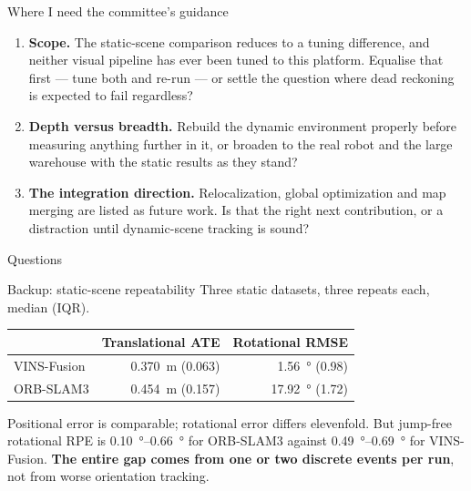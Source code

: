 \documentclass[aspectratio=169,11pt]{beamer}
\begin{document}
\begin{frame}{Where I need the committee's guidance}
  \begin{enumerate}
    \item \textbf{Scope.} The static-scene comparison reduces to a tuning
      difference, and neither visual pipeline has ever been tuned to this
      platform. Equalise that first --- tune both and re-run --- or settle the
      question where dead reckoning is expected to fail regardless?

      \vspace{0.6em}
    \item \textbf{Depth versus breadth.} Rebuild the dynamic environment
      properly before measuring anything further in it, or broaden to the real
      robot and the large warehouse with the static results as they stand?

      \vspace{0.6em}
    \item \textbf{The integration direction.} Relocalization, global
      optimization and map merging are listed as future work. Is that the right
      next contribution, or a distraction until dynamic-scene tracking is sound?
  \end{enumerate}
\end{frame}

\begin{frame}[standout]
  Questions
\end{frame}

\appendix

\begin{frame}{Backup: static-scene repeatability}
  Three static datasets, three repeats each, median (IQR).

  \vspace{0.8em}
  \centering
  \begin{tabular}{lrr}
    \toprule
    & Translational ATE & Rotational RMSE \\
    \midrule
    VINS-Fusion & \SI{0.370}{\metre} (0.063) & \SI{1.56}{\degree} (0.98) \\
    ORB-SLAM3 & \SI{0.454}{\metre} (0.157) & \SI{17.92}{\degree} (1.72) \\
    \bottomrule
  \end{tabular}

  \vspace{0.8em}
  \raggedright
  Positional error is comparable; rotational error differs elevenfold. But
  jump-free rotational RPE is \SIrange{0.10}{0.66}{\degree} for ORB-SLAM3 against
  \SIrange{0.49}{0.69}{\degree} for VINS-Fusion. \textbf{The entire gap comes from
  one or two discrete events per run}, not from worse orientation tracking.
\end{frame}
\end{document}
